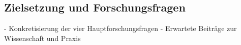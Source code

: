 \subsection{Zielsetzung und Forschungsfragen} \label{sec:Zielsetzung und Forschungsfragen}

- Konkretisierung der vier Hauptforschungsfragen
- Erwartete Beiträge zur Wissenschaft und Praxis